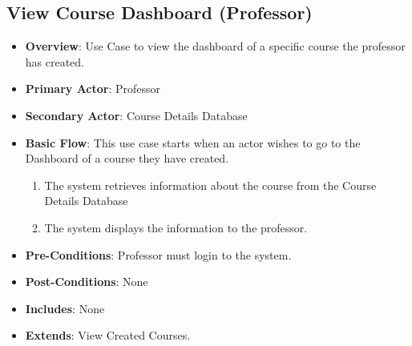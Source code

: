 \documentclass[12pt, a4]{article}
\begin{document}
\subsection{View Course Dashboard (Professor)}
\begin{itemize}
    \item \textbf{Overview}: Use Case to view the dashboard of a specific course the professor has created.
    \item \textbf{Primary Actor}: Professor
    \item \textbf{Secondary Actor}: Course Details Database
    \item \textbf{Basic Flow}: This use case starts when an actor wishes to go to the Dashboard of a course they have created.
        \begin{enumerate}
            \item The system retrieves information about the course from the Course Details Database
            \item The system displays the information to the professor.
        \end{enumerate}
    \item \textbf{Pre-Conditions}: Professor must login to the system.
    \item \textbf{Post-Conditions}: None
    \item \textbf{Includes}: None
    \item \textbf{Extends}: View Created Courses.
\end{itemize}

\end{document}
